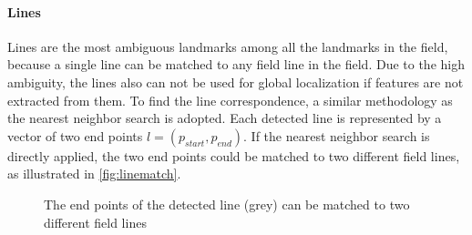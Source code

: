 \paragraph{Lines}
Lines are the most ambiguous landmarks among all the landmarks in the field, because a single line can be matched to any field line in the field. Due to the high ambiguity, the lines also can not be used for global localization if features are not extracted from them. To find the line correspondence, a similar methodology as the nearest neighbor search is adopted. Each detected line is represented by a vector of two end points $l=(p_{start}, p_{end})$. If the nearest neighbor search is directly applied, the two end points could be matched to two different field lines, as illustrated in \autoref{fig:linematch}.

\begin{figure}[h!]
\centering
{}
  \caption[Matching of end points of the detected line]{The end points of the detected line (grey) can be matched to two different field lines}
\label{fig:linematch}
\end{figure}

